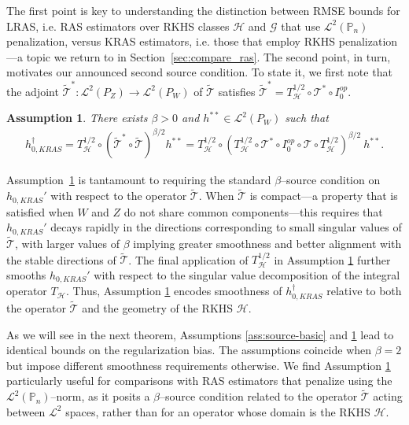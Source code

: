 \documentclass[twoside,11pt]{article}
\newtheorem{assumption}{Assumption}
\newcommand{\mc}{\mathcal}
\begin{document}
The first point is key to understanding the distinction between RMSE bounds for LRAS, i.e. RAS estimators over RKHS classes $\mc{H}$ and $\mc{G}$ that use $\mathcal{L}^2(\mathbb{P}_n)$ penalization, versus KRAS estimators, i.e. those that employ RKHS penalization—a topic we return to in Section~\ref{sec:compare_ras}. The second point, in turn, motivates our announced second source condition. To state it, we first note that the adjoint $\widetilde{\mc{T}}^*:\mc{L}^2(P_Z)\rightarrow\mc{L}^2(P_W)$ of $\widetilde{\mc{T}}$ satisfies $\widetilde{\mc{T}}^* = T_\mc{H}^{1/2}  \circ \mc{T}^*\circ I_0^{op}$. 
    \begin{assumption}
    There exists $\beta>0$ and $h^{**}\in\mathcal{L}^2(P_{W})$ such that 
    \begin{align}
h_{0,KRAS}^\dag =T^{1/2}_{\mc{H}}\circ\left(\widetilde{\mc{T}}^*\circ\widetilde{\mc{T}}\right)^{\beta/2} h^{**}=T^{1/2}_{\mc{H}}\circ \left( T_\mc{H}^{1/2} \circ \mc{T}^*\circ  I_0^{op} \circ  \mc{T} \circ  T_\mc{H}^{1/2}\right)^{\beta/2} \: h^{**}.
\label{eq:source_kras}
    \end{align}
     \label{ass:source}
\end{assumption} 
Assumption~\ref{ass:source} is tantamount to requiring the standard $\beta$--source condition on $h_{0,KRAS}'$ with respect to the operator $\widetilde{\mc{T}}$. When $\widetilde{\mc{T}}$ is compact---a property that is satisfied when $W$ and $Z$ do not share common components---this requires that $h_{0,KRAS}'$ decays rapidly in the directions corresponding to small singular values of $\widetilde{\mc{T}}$, with larger values of $\beta$ implying greater smoothness and better alignment with the stable directions of $\widetilde{\mc{T}}$. The final application of  $T^{1/2}_{\mc{H}}$ in Assumption \ref{ass:source} further smooths $h_{0,KRAS}'$ with respect to the singular value decomposition of the integral operator $T_{\mc{H}}$. Thus, Assumption \ref{ass:source} encodes smoothness of $h_{0,KRAS}^\dag$ relative to both the operator $\widetilde{\mc{T}}$ and the geometry of the RKHS $\mc{H}$. 

As we will see in the next theorem, Assumptions \ref{ass:source-basic} and \ref{ass:source} lead to identical bounds on the regularization bias. The assumptions coincide when $\beta = 2$ but impose different smoothness requirements otherwise. We find Assumption \ref{ass:source} particularly useful for comparisons with RAS estimators that penalize using the $\mc{L}^2(\mathbb{P}_n)$--norm, as it posits a $\beta$--source condition related to the operator $\widetilde{\mc{T}}$ acting between $\mathcal{L}^2$ spaces, rather than for an operator whose domain is the RKHS $\mc{H}$.
\end{document}
